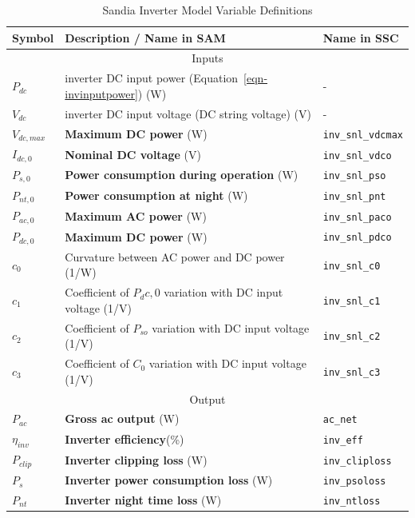 \documentclass[12pt,letterpaper]{article}
\begin{document}
\begin{table}
\begin{center}
\caption{Sandia Inverter Model Variable Definitions}
\begin{tabular}{lll}
\midrule
Symbol & Description / \textbf{Name in SAM} & Name in SSC \\
\midrule
\multicolumn{3}{c}{Inputs}\\
$P_{dc}$ & inverter DC input power (Equation~\ref{eqn-invinputpower}) (W) & - \\
$V_{dc}$ & inverter DC input voltage (DC string voltage) (V) & - \\
$V_{dc,max}$ & \textbf{Maximum DC power} (W)& \texttt{inv\_snl\_vdcmax} \\
$I_{dc,0}$ & \textbf{Nominal DC voltage} (V)& \texttt{inv\_snl\_vdco} \\
$P_{s,0}$ & \textbf{Power consumption during operation} (W)& \texttt{inv\_snl\_pso} \\
$P_{nt,0}$ & \textbf{Power consumption at night} (W)& \texttt{inv\_snl\_pnt} \\
$P_{ac,0}$ & \textbf{Maximum AC power} (W)& \texttt{inv\_snl\_paco} \\
$P_{dc,0}$ & \textbf{Maximum DC power} (W) & \texttt{inv\_snl\_pdco} \\
$c_0$ & Curvature between AC power and DC power (1/W) & \texttt{inv\_snl\_c0} \\
$c_1$ & Coefficient of $P_dc,0$ variation with DC input voltage (1/V) &  \texttt{inv\_snl\_c1} \\
$c_2$ & Coefficient of $P_{so}$ variation with DC input voltage (1/V) &\texttt{inv\_snl\_c2} \\
$c_3$ & Coefficient of $C_0$ variation with DC input voltage (1/V) & \texttt{inv\_snl\_c3} \\
\midrule
\multicolumn{3}{c}{Output}\\
$P_{ac}$ & \textbf{Gross ac output} (W)& \texttt{ac\_net} \\
$\eta_{inv}$ & \textbf{Inverter efficiency}(\%) & \texttt{inv\_eff}  \\
$P_{clip}$ & \textbf{Inverter clipping loss} (W)& \texttt{inv\_cliploss}  \\
$P_{s}$ & \textbf{Inverter power consumption loss} (W)& \texttt{inv\_psoloss}  \\
$P_{nt}$ & \textbf{Inverter night time loss} (W)& \texttt{inv\_ntloss}  \\
\hline
\end{tabular}
\label{tab-sandiainvertervars}
\end{center}
\end{table}
\end{document}
